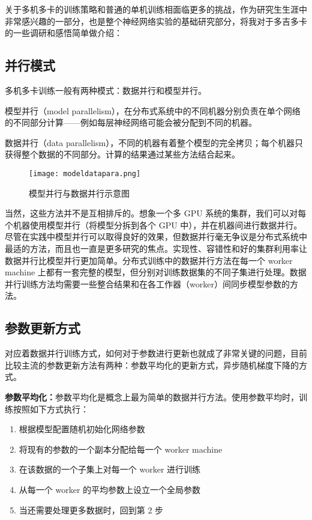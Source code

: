 关于多机多卡的训练策略和普通的单机训练相面临更多的挑战，作为研究生生涯中非常感兴趣的一部分，也是整个神经网络实验的基础研究部分，将我对于多吉多卡的一些调研和感悟简单做介绍：
\subsection{并行模式}
多机多卡训练一般有两种模式：数据并行和模型并行。

模型并行（model parallelism），在分布式系统中的不同机器分别负责在单个网络的不同部分计算——例如每层神经网络可能会被分配到不同的机器。

数据并行（data parallelism），不同的机器有着整个模型的完全拷贝；每个机器只获得整个数据的不同部分。计算的结果通过某些方法结合起来。
\begin{figure}[!ht]
 \centering
	\texttt{[image: modeldatapara.png]}
	\caption{模型并行与数据并行示意图}
\end{figure}

当然，这些方法并不是互相排斥的。想象一个多 GPU 系统的集群，我们可以对每个机器使用模型并行（将模型分拆到各个 GPU 中），并在机器间进行数据并行。
尽管在实践中模型并行可以取得良好的效果，但数据并行毫无争议是分布式系统中最适的方法，而且也一直是更多研究的焦点。实现性、容错性和好的集群利用率让数据并行比模型并行更加简单。分布式训练中的数据并行方法在每一个 worker machine 上都有一套完整的模型，但分别对训练数据集的不同子集进行处理。数据并行训练方法均需要一些整合结果和在各工作器（worker）间同步模型参数的方法。

\subsection{参数更新方式}
对应着数据并行训练方式，如何对于参数进行更新也就成了非常关键的问题，目前比较主流的参数更新方法有两种：参数平均化的更新方式，异步随机梯度下降的方式。

\textbf{参数平均化：}参数平均化是概念上最为简单的数据并行方法。使用参数平均时，训练按照如下方式执行：
\begin{enumerate}
\item 根据模型配置随机初始化网络参数
\item 将现有的参数的一个副本分配给每一个 worker machine
\item 在该数据的一个子集上对每一个 worker 进行训练
\item 从每一个 worker 的平均参数上设立一个全局参数
\item 当还需要处理更多数据时，回到第 2 步
\end{enumerate}

